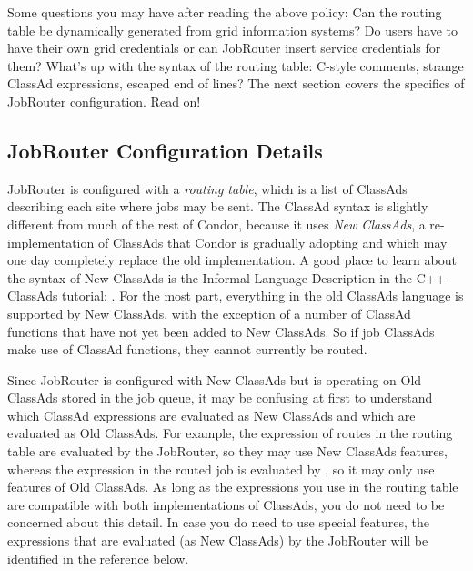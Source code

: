 Some questions you may have after reading the above policy: Can the
routing table be dynamically generated from grid information systems?
Do users have to have their own grid credentials or can JobRouter
insert service credentials for them?  What's up with the syntax of the
routing table: C-style comments, strange ClassAd expressions, escaped
end of lines?  The next section covers the specifics of JobRouter
configuration.  Read on!

\subsection{JobRouter Configuration Details}

JobRouter is configured with a \textit{routing table}, which is a list
of ClassAds describing each site where jobs may be sent.  The ClassAd
syntax is slightly different from much of the rest of Condor, because
it uses \emph{New ClassAds}, a re-implementation of ClassAds that
Condor is gradually adopting and which may one day completely replace
the old implementation.  A good place to learn about the syntax of New
ClassAds is the Informal Language Description in the C++ ClassAds
tutorial: .
For the most part, everything in the old ClassAds language is
supported by New ClassAds, with the exception of a number of ClassAd
functions that have not yet been added to New ClassAds.  So if job
ClassAds make use of ClassAd functions, they cannot currently be
routed.

Since JobRouter is configured with New ClassAds but is operating on
Old ClassAds stored in the job queue, it may be confusing at first to
understand which ClassAd expressions are evaluated as New ClassAds and
which are evaluated as Old ClassAds.  For example, the
 expression of routes in the routing table are
evaluated by the JobRouter, so they may use New ClassAds features,
whereas the  expression in the routed job is
evaluated by , so it may only use features of Old
ClassAds.  As long as the expressions you use in the routing table are
compatible with both implementations of ClassAds, you do not need to
be concerned about this detail.  In case you do need to use special
features, the expressions that are evaluated (as New ClassAds) by the
JobRouter will be identified in the reference below.

